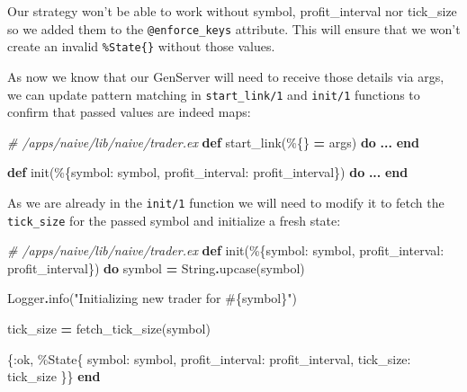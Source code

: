 \documentclass[
  oneside]{book}
\newenvironment{Shaded}{\begin{snugshade}}{\end{snugshade}}
\newcommand{\CommentTok}[1]{\textcolor[rgb]{0.56,0.35,0.01}{\textit{#1}}}
\newcommand{\ConstantTok}[1]{\textcolor[rgb]{0.00,0.00,0.00}{#1}}
\newcommand{\KeywordTok}[1]{\textcolor[rgb]{0.13,0.29,0.53}{\textbf{#1}}}
\newcommand{\NormalTok}[1]{#1}
\newcommand{\OperatorTok}[1]{\textcolor[rgb]{0.81,0.36,0.00}{\textbf{#1}}}
\newcommand{\OtherTok}[1]{\textcolor[rgb]{0.56,0.35,0.01}{#1}}
\newcommand{\StringTok}[1]{\textcolor[rgb]{0.31,0.60,0.02}{#1}}
\newcommand{\VariableTok}[1]{\textcolor[rgb]{0.00,0.00,0.00}{#1}}
\begin{document}
Our strategy won't be able to work without symbol, profit\_interval nor tick\_size so we added them to the \texttt{@enforce\_keys} attribute. This will ensure that we won't create an invalid \texttt{\%State\{\}} without those values.

As now we know that our GenServer will need to receive those details via args, we can update pattern matching in \texttt{start\_link/1} and \texttt{init/1} functions to confirm that passed values are indeed maps:

\begin{Shaded}
\begin{Highlighting}[]
  \CommentTok{\# /apps/naive/lib/naive/trader.ex}
  \KeywordTok{def}\NormalTok{ start\_link(\%\{\} }\OperatorTok{=}\NormalTok{ args) }\KeywordTok{do}
    \OperatorTok{...}
  \KeywordTok{end}

  \KeywordTok{def}\NormalTok{ init(\%\{}\VariableTok{symbol:}\NormalTok{ symbol, }\VariableTok{profit\_interval:}\NormalTok{ profit\_interval\}) }\KeywordTok{do}
    \OperatorTok{...}
  \KeywordTok{end}
\end{Highlighting}
\end{Shaded}

As we are already in the \texttt{init/1} function we will need to modify it to fetch the \texttt{tick\_size} for the passed symbol and initialize a fresh state:

\begin{Shaded}
\begin{Highlighting}[]
  \CommentTok{\# /apps/naive/lib/naive/trader.ex}
  \KeywordTok{def}\NormalTok{ init(\%\{}\VariableTok{symbol:}\NormalTok{ symbol, }\VariableTok{profit\_interval:}\NormalTok{ profit\_interval\}) }\KeywordTok{do}
\NormalTok{    symbol }\OperatorTok{=} \ConstantTok{String}\OperatorTok{.}\NormalTok{upcase(symbol)}

    \ConstantTok{Logger}\OperatorTok{.}\NormalTok{info(}\StringTok{"Initializing new trader for }\OtherTok{\#\{}\NormalTok{symbol}\OtherTok{\}}\StringTok{"}\NormalTok{)}

\NormalTok{    tick\_size }\OperatorTok{=}\NormalTok{ fetch\_tick\_size(symbol)}

\NormalTok{    \{}\VariableTok{:ok}\NormalTok{,}
\NormalTok{     \%}\ConstantTok{State}\NormalTok{\{}
       \VariableTok{symbol:}\NormalTok{ symbol,}
       \VariableTok{profit\_interval:}\NormalTok{ profit\_interval,}
       \VariableTok{tick\_size:}\NormalTok{ tick\_size}
\NormalTok{     \}\}}
  \KeywordTok{end}
\end{Highlighting}
\end{Shaded}
\end{document}
